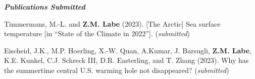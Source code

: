 \documentclass[margin,line,palatino,courier,10pt]{res}
\begin{document}
\begin{resume}
\textit{\textbf{Publications Submitted}}
\vspace*{-0.1in}\\
\begin{etaremune}[leftmargin=0in,topsep=0in,parsep=0in]
\item Timmermans, M.-L. and \textbf{Z.M. Labe} (2023). [The Arctic] Sea surface temperature [in “State of the Climate in 2022”]. (\textit{submitted})
\item Eischeid, J.K., M.P. Hoerling, X.-W. Quan, A.Kumar, J. Barsugli, \textbf{Z.M. Labe}, K.E. Kunkel, C.J. Schreck III, D.R. Easterling, and T. Zhang (2023). Why has the summertime central U.S. warming hole not disappeared? (\textit{submitted})
\end{etaremune}


\end{resume}
\end{document}
